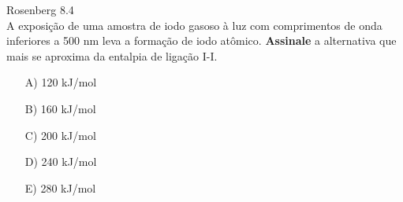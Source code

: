 \begin{problem} [answer = D]
    Rosenberg 8.4\\
A exposição de uma amostra de iodo gasoso à luz com comprimentos de onda inferiores a 500 nm leva a formação de iodo atômico. 
\textbf{Assinale} a alternativa que mais se aproxima da entalpia de ligação I-I.
\begin{itemize}
    \item [A)] 120 kJ/mol
    \item [B)] 160 kJ/mol
    \item [C)] 200 kJ/mol
    \item [D)] 240 kJ/mol
    \item [E)] 280 kJ/mol
\end{itemize}

\end{problem}